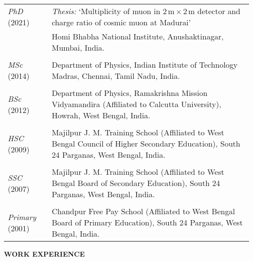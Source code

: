 \documentclass[12pt]{article}
\begin{document}
\vspace{0.4cm}
\begin{tabular}{p{3cm} p{14cm} }

  {\emph{PhD} (2021)} &  \emph{Thesis:} `Multiplicity of muon in $2$\,m\,$\times$\,2\,m detector and charge ratio of cosmic muon at Madurai'\\
  \vspace{0.2cm}
  & Homi Bhabha National Institute, Anushaktinagar, Mumbai, India. \\
  & \\
  {\emph{MSc} (2014)} & Department of Physics, Indian Institute of Technology Madras, Chennai, Tamil Nadu, India.\\
  & \\
  {\emph{BSc} (2012)} & Department of Physics, Ramakrishna Mission Vidyamandira (Affiliated to Calcutta University), Howrah, West Bengal, India.\\
  & \\
  {\emph{HSC} (2009)} & Majilpur J. M. Training School (Affiliated to West Bengal Council of Higher Secondary Education), South 24 Parganas, West Bengal, India. \\
  & \\
  {\emph{SSC} (2007)} & Majilpur J. M. Training School (Affiliated to West Bengal Board of Secondary Education), South 24 Parganas, West Bengal, India. \\
  & \\
  {\emph{Primary} (2001)} & Chandpur Free Pay School (Affiliated to West Bengal Board of Primary Education), South 24 Parganas, West Bengal, India.
  
\end{tabular}

\pagebreak
\vspace{0.5cm}
\colorbox{gray!40}{\begin{minipage}{17.5cm}
\bf {WORK EXPERIENCE } 
\end{minipage} }
\end{document}
